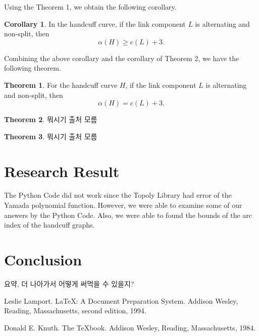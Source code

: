 \documentclass{article}
\theoremstyle{definition}
\theoremstyle{theorem}
\newtheorem{theorem}{Theorem}
\theoremstyle{proposition}
\theoremstyle{corollary}
\newtheorem*{corol}{Corollary}
\begin{document}
Using the Theorem 1, we obtain the following corollary.

\begin{corol}
    In the handcuff curve, if the link component $L$ is alternating and non-split, then
    \[ \alpha(H) \geq c(L)+3. \]
\end{corol}

Combining the above corollary and the corollary of Theorem 2, we have the following theorem.

\begin{theorem}
    For the handcuff curve $H$, if the link component $L$ is alternating and non-split, then
    \[ \alpha(H) = c(L)+3. \]
\end{theorem}

\begin{theorem}
    뭐시기 출처 모름
\end{theorem}
\begin{theorem}
    뭐시기 출처 모름
\end{theorem}


\section{Research Result}
The Python Code did not work since the Topoly Library had error of the Yamada polynomial function. However, we were able to examine some of our answers by the Python Code. Also, we were able to found the bounds of the arc index of the handcuff graphs.


\section{Conclusion}
요약, 더 나아가서 어떻게 써먹을 수 있을지?

\begin{thebibliography}{9}
    Leslie Lamport.
    \newblock \LaTeX: A Document Preparation System.
    \newblock Addison Wesley, Reading, Massachusetts, second edition, 1994.
    
    Donald E. Knuth.
    \newblock The \TeX book.
    \newblock Addison Wesley, Reading, Massachusetts, 1984.
\end{thebibliography}
\end{document}
